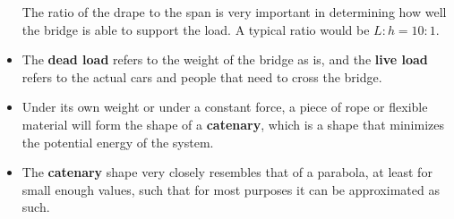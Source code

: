 \begin{itemize}
\begin{center}
    \end{center}
    The ratio of the drape to the span is very important in determining how well the bridge is able to support the load. A typical ratio would be $L:h=10:1$.
    \item The \textbf{dead load} refers to the weight of the bridge as is, and the \textbf{live load} refers to the actual cars and people that need to cross the bridge. 
    \item Under its own weight or under a constant force, a piece of rope or flexible material will form the shape of a \textbf{catenary}, which is a shape that minimizes the potential energy of the system.
    \item The \textbf{catenary} shape very closely resembles that of a parabola, at least for small enough values, such that for most purposes it can be approximated as such.
\end{itemize}